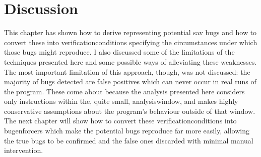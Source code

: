 \section{Discussion}

This chapter has shown how to derive {\StateMachines} representing
potential \gls{sav} bugs and how to convert these into
\glspl{verificationcondition} specifying the circumstances under which
those bugs might reproduce.  I also discussed some of the limitations
of the techniques presented here and some possible ways of alleviating
these weaknesses.  The most important limitation of this approach,
though, was not discussed: the majority of bugs detected are false
positives which can never occur in real runs of the program.  These
come about because the {\StateMachine} analysis presented here
considers only instructions within the, quite small,
\gls{analysiswindow}, and makes highly conservative assumptions about
the program's behaviour outside of that window.  The next chapter will
show how to convert these \glspl{verificationcondition} into
\glspl{bugenforcer} which make the potential bugs reproduce far more
easily, allowing the true bugs to be confirmed and the false ones
discarded with minimal manual intervention.

